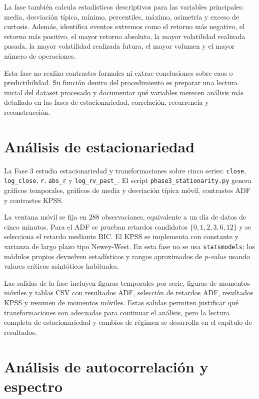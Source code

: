 La fase también calcula estadísticos descriptivos para las variables principales: media, desviación típica, mínimo, percentiles, máximo, asimetría y exceso de curtosis. Además, identifica eventos extremos como el retorno más negativo, el retorno más positivo, el mayor retorno absoluto, la mayor volatilidad realizada pasada, la mayor volatilidad realizada futura, el mayor volumen y el mayor número de operaciones.

Esta fase no realiza contrastes formales ni extrae conclusiones sobre caos o predictibilidad. Su función dentro del procedimiento es preparar una lectura inicial del dataset procesado y documentar qué variables merecen análisis más detallado en las fases de estacionariedad, correlación, recurrencia y reconstrucción.

\section{Análisis de estacionariedad}\label{sec:analisis-estacionariedad}

La Fase 3 estudia estacionariedad y transformaciones sobre cinco series: \texttt{close}, \texttt{log\_\allowbreak close}, \texttt{r}, \texttt{abs\_\allowbreak r} y \texttt{log\_\allowbreak rv\_\allowbreak past\_}. El script \texttt{phase3\_\allowbreak stationarity.py} genera gráficos temporales, gráficos de media y desviación típica móvil, contrastes ADF y contrastes KPSS.

La ventana móvil se fija en 288 observaciones, equivalente a un día de datos de cinco minutos. Para el ADF se prueban retardos candidatos \(\{0,1,2,3,6,12\}\) y se selecciona el retardo mediante BIC. El KPSS se implementa con constante y varianza de largo plazo tipo Newey-West. En esta fase no se usa \texttt{statsmodels}; los módulos propios devuelven estadísticos y rangos aproximados de \textit{p-value} usando valores críticos asintóticos habituales.

Las salidas de la fase incluyen figuras temporales por serie, figuras de momentos móviles y tablas CSV con resultados ADF, selección de retardos ADF, resultados KPSS y resumen de momentos móviles. Estas salidas permiten justificar qué transformaciones son adecuadas para continuar el análisis, pero la lectura completa de estacionariedad y cambios de régimen se desarrolla en el capítulo de resultados.

\section{Análisis de autocorrelación y espectro}\label{sec:autocorrelacion-espectro}

